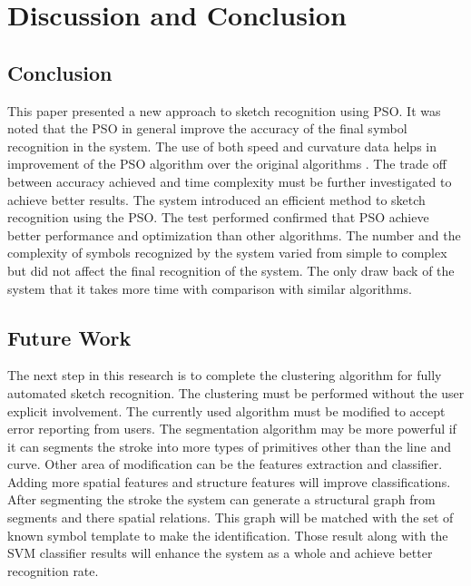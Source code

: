 \chapter{Discussion and Conclusion}
\label{sec:DiscussionConclusion}

\section{Conclusion}
\label{sec:ConclusionConclusion}

This paper presented a new approach to sketch recognition using PSO. It was noted that the PSO in general improve the accuracy of the final symbol recognition in the system. The use of both speed and curvature data helps in improvement of the PSO algorithm over the original algorithms \cite{CruveDivisionSwarm,PolygonApproximationPSO}. The trade off between accuracy achieved and time complexity must be further investigated to achieve better results.  The system introduced an efficient method to sketch recognition using the PSO. The test performed confirmed that PSO achieve better performance and optimization than other algorithms. The number and the complexity of symbols recognized by the system varied from simple to complex but did not affect the final recognition of the system. The only draw back of the system that it takes more time with comparison with similar algorithms. 


\newpage

\section{Future Work}
\label{sec:FutureWork}


The next step in this research is to complete the clustering algorithm for fully automated sketch recognition. The clustering must be performed without the user explicit involvement.  The currently used algorithm must be modified to accept error reporting from users. The segmentation algorithm may be more powerful if it can segments the stroke into more types of primitives other than the line and curve. Other area of modification can be the features extraction and classifier. Adding more spatial features and structure features will improve classifications. After segmenting the stroke the system can generate a structural graph from segments and there spatial relations. This graph will be matched with the set of known symbol template to make the identification. Those result along with the SVM classifier results will enhance the system as a whole and achieve better recognition rate.  %